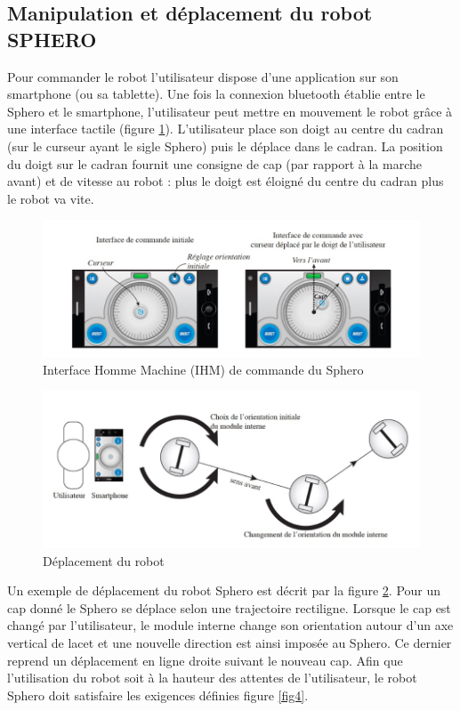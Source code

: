 \subsection{Manipulation et déplacement du robot SPHERO}

Pour commander le robot l'utilisateur dispose d'une application sur son smartphone (ou sa tablette). Une fois la connexion bluetooth établie entre le Sphero et le smartphone, l'utilisateur peut mettre en mouvement le robot grâce à une interface tactile (figure \ref{fig2}). L'utilisateur place son doigt au centre du cadran (sur le curseur ayant le sigle Sphero) puis le déplace dans le cadran. La position du doigt sur le cadran fournit une consigne de cap (par rapport à la marche avant) et de vitesse au robot : plus le doigt est éloigné du centre du cadran plus le robot va vite.

\begin{figure}[!ht]\begin{center}
 \includegraphics[width=0.8\linewidth]{img/figure_2}
 \caption{Interface Homme Machine (IHM) de commande du Sphero}
 \label{fig2}
\end{center}\end{figure}

\begin{figure}[!ht]\begin{center}
 \includegraphics[width=0.8\linewidth]{img/figure_3}
 \caption{Déplacement du robot}
 \label{fig3}
\end{center}\end{figure}

\newpage

Un exemple de déplacement du robot Sphero est décrit par la figure \ref{fig3}. Pour un cap donné le Sphero se déplace selon une trajectoire rectiligne. Lorsque le cap est changé par l'utilisateur, le module interne change son orientation autour d'un axe vertical de lacet et une nouvelle direction est ainsi imposée au Sphero. Ce dernier reprend un déplacement en ligne droite suivant le nouveau cap. Afin que l'utilisation du robot soit à la hauteur des attentes de l'utilisateur, le robot Sphero doit satisfaire les exigences définies figure \ref{fig4}. 

